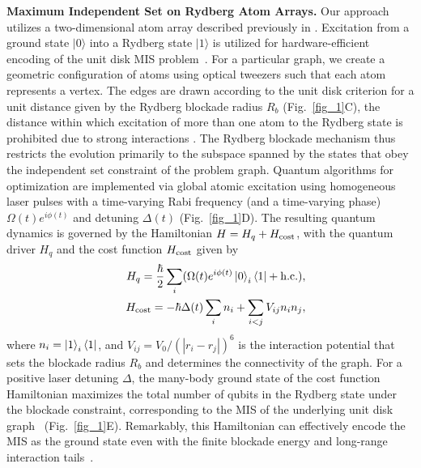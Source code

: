 \documentclass[twocolumn,amssymb,secnumarabic, prl, aps, nofootinbib]{revtex4-1}
\begin{document}
\noindent \textbf
{Maximum Independent Set on Rydberg Atom Arrays.}
Our approach utilizes a two-dimensional atom array described previously in \cite{ebadi_quantum_2020}. Excitation from a ground state $|0\rangle$ into a Rydberg state $|1\rangle$ is utilized for hardware-efficient encoding of the unit disk MIS  problem~\cite{pichler_quantum_2018}. For a particular graph, we create a geometric configuration of atoms using optical tweezers such that each atom represents a vertex. The edges are drawn according to the unit disk criterion for a unit distance given by the Rydberg blockade radius $R_b$ (Fig.~\ref{fig_1}C), the distance 
within which excitation of more than one atom to the Rydberg state is prohibited due to strong interactions \cite{lukin_dipole_2001}. The Rydberg blockade mechanism thus restricts the evolution primarily to the subspace spanned by the states that obey the independent set constraint of the problem graph. Quantum algorithms for optimization are implemented via global atomic excitation using homogeneous laser pulses with a time-varying Rabi frequency (and a time-varying phase) $\Omega(t) e^{i\phi(t)}$ and detuning $\Delta(t)$ (Fig.~\ref{fig_1}D). The resulting quantum dynamics is governed by the Hamiltonian $H= H_q + H_{\rm cost}$, with the quantum driver $H_q$ and the cost function $H_{\rm cost}$ given by
\begin{align}\label{Eq:Hamiltonian} 
	H_q = \frac{\hbar}{2} \sum_{i}(\Omega(t) e^{i\phi(t)} \ket{0}_{i}\bra{1} + {\rm h.c.}),\nonumber \\
	 \quad  H_{\rm cost} = - \hbar \Delta(t) \sum_{i} n_i
	+ \sum_{i<j}V_{ij}n_i n_j,\end{align}
where $n_i = \ket{1}_i\bra{1}$,  and $V_{ij} = V_0/(|r_{i}-r_{j}|)^{6}$ is the interaction potential that sets the blockade radius $R_b$ and
determines the connectivity of the graph. For a positive laser detuning $\Delta$, the many-body ground state of the cost function Hamiltonian maximizes the total number of qubits in the Rydberg state under the blockade constraint, corresponding to the MIS of the underlying unit disk graph~\cite{pichler_quantum_2018} (Fig.~\ref{fig_1}E). Remarkably, this Hamiltonian can effectively encode the MIS as the ground state even with the finite blockade energy and long-range interaction tails~\cite{pichler_quantum_2018}.
\end{document}
